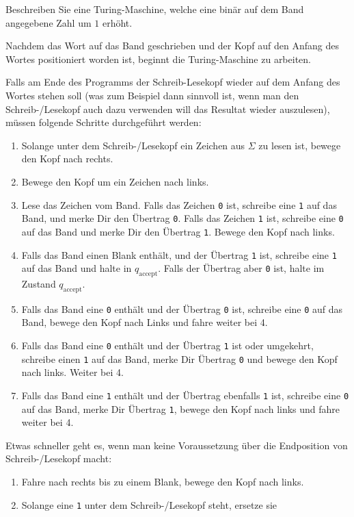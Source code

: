 Beschreiben Sie eine Turing-Maschine, welche eine binär auf dem
Band angegebene Zahl um $1$ erhöht.


\begin{loesung}
Nachdem das Wort auf das Band geschrieben und der Kopf auf den
Anfang des Wortes positioniert worden ist, beginnt die Turing-Maschine
zu arbeiten. 

Falls am Ende des Programms der Schreib-Lesekopf wieder auf dem
Anfang des Wortes stehen soll (was zum Beispiel dann sinnvoll ist,
wenn man den Schreib-/Lesekopf auch dazu verwenden will das
Resultat wieder auszulesen),  müssen folgende
Schritte durchgeführt werden:
\begin{enumerate}
\item Solange unter dem Schreib-/Lesekopf ein Zeichen aus $\Sigma$
zu lesen ist, bewege den Kopf nach rechts.
\item Bewege den Kopf um ein Zeichen nach links.
\item Lese das Zeichen vom Band. Falls das Zeichen {\tt 0} ist,
schreibe eine {\tt 1} auf das Band, und merke Dir den Übertrag {\tt 0}.
Falls das Zeichen {\tt 1} ist, schreibe eine {\tt 0} auf das Band und
merke Dir den Übertrag {\tt 1}.
Bewege den Kopf nach links.
\item Falls das Band einen Blank enthält, und der Übertrag {\tt 1}
ist, schreibe eine {\tt 1} auf das Band und halte in $q_{\text{accept}}$.
Falls der Übertrag aber {\tt 0} ist, halte im Zustand $q_{\text{accept}}$.
\item Falls das Band eine {\tt 0} enthält und der Übertrag {\tt 0} ist,
schreibe eine {\tt 0} auf das Band, bewege den Kopf nach Links und fahre
weiter bei 4.
\item Falls das Band eine {\tt 0} enthält und der Übertrag {\tt 1}
ist oder umgekehrt, schreibe einen {\tt 1} auf das Band, merke Dir
Übertrag {\tt 0} und bewege den Kopf nach links. Weiter bei 4.
\item Falls das Band eine {\tt 1} enthält und der Übertrag ebenfalls
{\tt 1} ist, schreibe eine {\tt 0} auf das Band, merke Dir Übertrag {\tt 1},
bewege den Kopf nach links und fahre weiter bei 4.
\end{enumerate}
Etwas schneller geht es, wenn man keine Voraussetzung über die
Endposition von Schreib-/Lesekopf macht:
\begin{enumerate}
\item Fahre nach rechts bis zu einem Blank, bewege den Kopf nach links.
\item Solange eine {\tt 1} unter dem Schreib-/Lesekopf steht, ersetze sie

\end{enumerate}
\end{loesung}
